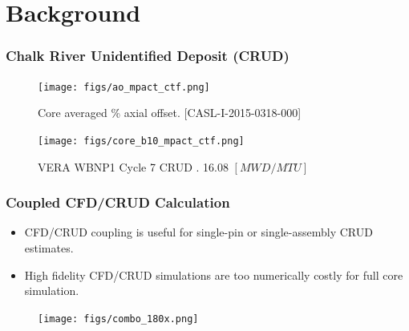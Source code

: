 \documentclass[t, pdftex]{beamer}
\begin{document}
\section{Background}
\begin{frame}
    \frametitle{Chalk River Unidentified Deposit (CRUD)}
    \begin{figure}
        \centering
        \begin{minipage}{.5\textwidth}
            \centering
            \texttt{[image: figs/ao\_mpact\_ctf.png]}
            \caption{Core averaged \% axial offset. [CASL-I-2015-0318-000]}
        \end{minipage}%
        \begin{minipage}{.5\textwidth}
            \centering
            \texttt{[image: figs/core\_b10\_mpact\_ctf.png]}
            \caption{VERA WBNP1 Cycle 7 CRUD . 16.08 $[MWD/MTU]$}
        \end{minipage}
    \end{figure}
\end{frame}

\begin{frame}[shrink=20]
    \frametitle{Coupled CFD/CRUD Calculation}
    \begin{itemize}
    \item CFD/CRUD coupling is useful for single-pin or single-assembly CRUD estimates.
    \item High fidelity CFD/CRUD simulations are too numerically costly for full core simulation.
    \end{itemize}
        \begin{figure}[!htbp]
\centering
\texttt{[image: figs/combo\_180x.png]}
\label{log_closed}
    \end{figure}
\end{frame}
\end{document}
